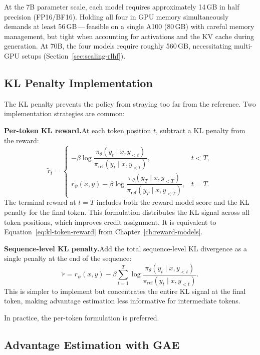 At the 7B parameter scale, each model requires approximately 14\,GB in half precision (FP16/BF16). Holding all four in GPU memory simultaneously demands at least 56\,GB\,---\,feasible on a single A100 (80\,GB) with careful memory management, but tight when accounting for activations and the KV cache during generation. At 70B, the four models require roughly 560\,GB, necessitating multi-GPU setups (Section~\ref{sec:scaling-rlhf}).

\subsection{KL Penalty Implementation}
\label{sec:kl-implementation}

The KL penalty prevents the policy from straying too far from the reference. Two implementation strategies are common:

\textbf{Per-token KL reward.}\quad At each token position $t$, subtract a KL penalty from the reward:
\begin{equation}
\label{eq:per-token-kl}
\tilde{r}_t = \begin{cases}
  -\beta \log\dfrac{\pi_\theta(y_t \mid x, y_{<t})}{\pi_{\mathrm{ref}}(y_t \mid x, y_{<t})}, & t < T, \\[6pt]
  r_\psi(x, y) - \beta \log\dfrac{\pi_\theta(y_T \mid x, y_{<T})}{\pi_{\mathrm{ref}}(y_T \mid x, y_{<T})}, & t = T.
\end{cases}
\end{equation}
The terminal reward at $t = T$ includes both the reward model score and the KL penalty for the final token. This formulation distributes the KL signal across all token positions, which improves credit assignment. It is equivalent to Equation~\eqref{eq:kl-token-reward} from Chapter~\ref{ch:reward-models}.

\textbf{Sequence-level KL penalty.}\quad Add the total sequence-level KL divergence as a single penalty at the end of the sequence:
\[
\tilde{r} = r_\psi(x, y) - \beta \sum_{t=1}^{T} \log\frac{\pi_\theta(y_t \mid x, y_{<t})}{\pi_{\mathrm{ref}}(y_t \mid x, y_{<t})}.
\]
This is simpler to implement but concentrates the entire KL signal at the final token, making advantage estimation less informative for intermediate tokens.

In practice, the per-token formulation is preferred.

\subsection{Advantage Estimation with GAE}
\label{sec:gae-lm}

